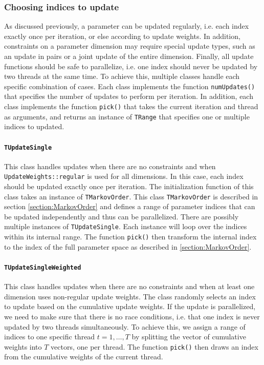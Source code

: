 \documentclass[a4paper,11pt]{article}
\newcommand{\class}[1]{\texttt{#1}}
\newcommand{\pubfunc}[1]{\texttt{#1()}}
\newcommand{\enum}[1]{\texttt{#1}}
\begin{document}
\subsubsection{Choosing indices to update}

As discussed previously, a parameter can be updated regularly, i.e. each index exactly once per iteration, or else according to update weights. In addition, constraints on a parameter dimension may require special update types, such as an update in pairs or a joint update of the entire dimension. Finally, all update functions should be safe to parallelize, i.e. one index should never be updated by two threads at the same time. To achieve this, multiple classes handle each specific combination of cases. Each class implements the function \pubfunc{numUpdates} that specifies the number of updates to perform per iteration. In addition, each class implements the function \pubfunc{pick} that takes the current iteration and thread as arguments, and returns an instance of \class{TRange} that specifies one or multiple indices to updated.

\paragraph{\class{TUpdateSingle}} This class handles updates when there are no constraints and when \enum{UpdateWeights::regular} is used for all dimensions. In this case, each index should be updated exactly once per iteration. The initialization function of this class takes an instance of \class{TMarkovOrder}. This class \class{TMarkovOrder} is described in section \ref{section:MarkovOrder} and defines a range of parameter indices that can be updated independently and thus can be parallelized. There are possibly multiple instances of \class{TUpdateSingle}. Each instance will loop over the indices within its internal range. The function \pubfunc{pick} then transform the internal index to the index of the full parameter space as described in \ref{section:MarkovOrder}.

\paragraph{\class{TUpdateSingleWeighted}} This class handles updates when there are no constraints and when at least one dimension uses non-regular update weights. The class randomly selects an index to update based on the cumulative update weights. If the update is parallelized, we need to make sure that there is no race conditions, i.e. that one index is never updated by two threads simultaneously. To achieve this, we assign a range of indices to one specific thread $t = 1, \ldots, T$ by splitting the vector of cumulative weights into $T$ vectors, one per thread. The function \pubfunc{pick} then draws an index from the cumulative weights of the current thread.
\end{document}
